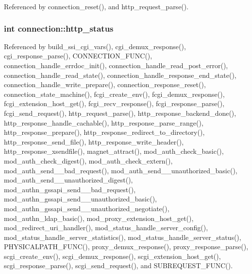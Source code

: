 Referenced by connection\-\_\-reset(), and http\-\_\-request\-\_\-parse().

\hypertarget{structconnection_a1fcd32a23ddbacfda74678d98fbf077f}{
\subsubsection[{http\-\_\-status}]{\setlength{\rightskip}{0pt plus 5cm}int connection\-::http\-\_\-status}}\label{structconnection_a1fcd32a23ddbacfda74678d98fbf077f}


Referenced by build\-\_\-ssi\-\_\-cgi\-\_\-vars(), cgi\-\_\-demux\-\_\-response(), cgi\-\_\-response\-\_\-parse(), C\-O\-N\-N\-E\-C\-T\-I\-O\-N\-\_\-\-F\-U\-N\-C(), connection\-\_\-handle\-\_\-errdoc\-\_\-init(), connection\-\_\-handle\-\_\-read\-\_\-post\-\_\-error(), connection\-\_\-handle\-\_\-read\-\_\-state(), connection\-\_\-handle\-\_\-response\-\_\-end\-\_\-state(), connection\-\_\-handle\-\_\-write\-\_\-prepare(), connection\-\_\-response\-\_\-reset(), connection\-\_\-state\-\_\-machine(), fcgi\-\_\-create\-\_\-env(), fcgi\-\_\-demux\-\_\-response(), fcgi\-\_\-extension\-\_\-host\-\_\-get(), fcgi\-\_\-recv\-\_\-response(), fcgi\-\_\-response\-\_\-parse(), fcgi\-\_\-send\-\_\-request(), http\-\_\-request\-\_\-parse(), http\-\_\-response\-\_\-backend\-\_\-done(), http\-\_\-response\-\_\-handle\-\_\-cachable(), http\-\_\-response\-\_\-parse\-\_\-range(), http\-\_\-response\-\_\-prepare(), http\-\_\-response\-\_\-redirect\-\_\-to\-\_\-directory(), http\-\_\-response\-\_\-send\-\_\-file(), http\-\_\-response\-\_\-write\-\_\-header(), http\-\_\-response\-\_\-xsendfile(), magnet\-\_\-attract(), mod\-\_\-auth\-\_\-check\-\_\-basic(), mod\-\_\-auth\-\_\-check\-\_\-digest(), mod\-\_\-auth\-\_\-check\-\_\-extern(), mod\-\_\-auth\-\_\-send\-\_\-\_\-bad\-\_\-request(), mod\-\_\-auth\-\_\-send\-\_\-\_\-unauthorized\-\_\-basic(), mod\-\_\-auth\-\_\-send\-\_\-\_\-unauthorized\-\_\-digest(), mod\-\_\-authn\-\_\-gssapi\-\_\-send\-\_\-\_\-bad\-\_\-request(), mod\-\_\-authn\-\_\-gssapi\-\_\-send\-\_\-\_\-unauthorized\-\_\-basic(), mod\-\_\-authn\-\_\-gssapi\-\_\-send\-\_\-\_\-unauthorized\-\_\-negotiate(), mod\-\_\-authn\-\_\-ldap\-\_\-basic(), mod\-\_\-proxy\-\_\-extension\-\_\-host\-\_\-get(), mod\-\_\-redirect\-\_\-uri\-\_\-handler(), mod\-\_\-status\-\_\-handle\-\_\-server\-\_\-config(), mod\-\_\-status\-\_\-handle\-\_\-server\-\_\-statistics(), mod\-\_\-status\-\_\-handle\-\_\-server\-\_\-status(), P\-H\-Y\-S\-I\-C\-A\-L\-P\-A\-T\-H\-\_\-\-F\-U\-N\-C(), proxy\-\_\-demux\-\_\-response(), proxy\-\_\-response\-\_\-parse(), scgi\-\_\-create\-\_\-env(), scgi\-\_\-demux\-\_\-response(), scgi\-\_\-extension\-\_\-host\-\_\-get(), scgi\-\_\-response\-\_\-parse(), scgi\-\_\-send\-\_\-request(), and S\-U\-B\-R\-E\-Q\-U\-E\-S\-T\-\_\-\-F\-U\-N\-C().

